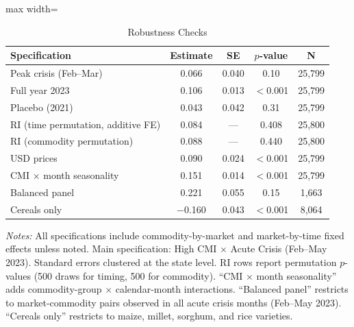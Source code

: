 \begin{table}[t]
\centering
\caption{Robustness Checks}
\label{tab:robustness}
\begin{adjustbox}{max width=\textwidth}
\begin{tabular}{lcccc}
\toprule
Specification & Estimate & SE & $p$-value & N \\
\midrule
Peak crisis (Feb--Mar) & 0.066 & 0.040 & 0.10 & 25,799 \\
Full year 2023 & 0.106 & 0.013 & $<$0.001 & 25,799 \\
Placebo (2021) & 0.043 & 0.042 & 0.31 & 25,799 \\
RI (time permutation, additive FE) & 0.084 & --- & 0.408 & 25,800 \\
RI (commodity permutation) & 0.088 & --- & 0.440 & 25,800 \\
USD prices & 0.090 & 0.024 & $<$0.001 & 25,799 \\
CMI $\times$ month seasonality & 0.151 & 0.014 & $<$0.001 & 25,799 \\
Balanced panel & 0.221 & 0.055 & 0.15 & 1,663 \\
Cereals only & $-$0.160 & 0.043 & $<$0.001 & 8,064 \\
\bottomrule
\end{tabular}
\end{adjustbox}
\par\vspace{0.3em}
{\footnotesize \textit{Notes:} All specifications include commodity-by-market and market-by-time fixed effects unless noted. Main specification: High CMI $\times$ Acute Crisis (Feb--May 2023). Standard errors clustered at the state level. RI rows report permutation $p$-values (500 draws for timing, 500 for commodity). ``CMI $\times$ month seasonality'' adds commodity-group $\times$ calendar-month interactions. ``Balanced panel'' restricts to market-commodity pairs observed in all acute crisis months (Feb--May 2023). ``Cereals only'' restricts to maize, millet, sorghum, and rice varieties.}
\end{table}
